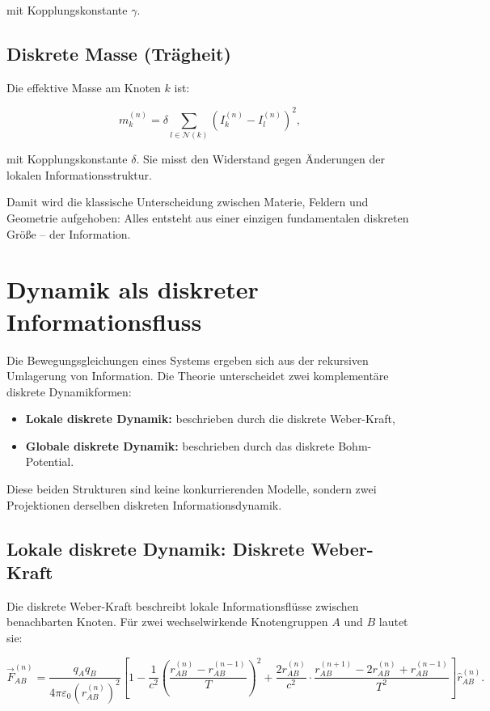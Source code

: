 mit Kopplungskonstante \( \gamma \).

\subsection{Diskrete Masse (Trägheit)}
\label{sub:diskrete_masse}

Die effektive Masse am Knoten \( k \) ist:

\[
m_k^{(n)} = \delta \sum_{l \in \mathcal{N}(k)} \left( I_k^{(n)} - I_l^{(n)} \right)^2,
\]

mit Kopplungskonstante \( \delta \). Sie misst den Widerstand gegen Änderungen der lokalen Informationsstruktur.

Damit wird die klassische Unterscheidung zwischen Materie, Feldern und Geometrie aufgehoben: Alles entsteht aus einer einzigen fundamentalen diskreten Größe – der Information.

\section{Dynamik als diskreter Informationsfluss}
\label{sec:dynamik_als_informationsfluss}

Die Bewegungsgleichungen eines Systems ergeben sich aus der rekursiven Umlagerung von Information. Die Theorie unterscheidet zwei komplementäre diskrete Dynamikformen:

\begin{itemize}
    \item \textbf{Lokale diskrete Dynamik:} beschrieben durch die diskrete Weber-Kraft,
    \item \textbf{Globale diskrete Dynamik:} beschrieben durch das diskrete Bohm-Potential.
\end{itemize}

Diese beiden Strukturen sind keine konkurrierenden Modelle, sondern zwei Projektionen derselben diskreten Informationsdynamik.

\subsection{Lokale diskrete Dynamik: Diskrete Weber-Kraft}
\label{sub:diskrete_weber_kraft}

Die diskrete Weber-Kraft beschreibt lokale Informationsflüsse zwischen benachbarten Knoten. Für zwei wechselwirkende Knotengruppen \( A \) und \( B \) lautet sie:

\[
\vec{F}_{AB}^{(n)} = \frac{q_A q_B}{4\pi\varepsilon_0 (r_{AB}^{(n)})^2} \left[ 1 - \frac{1}{c^2} \left( \frac{r_{AB}^{(n)} - r_{AB}^{(n-1)}}{T} \right)^2 + \frac{2 r_{AB}^{(n)}}{c^2} \cdot \frac{r_{AB}^{(n+1)} - 2r_{AB}^{(n)} + r_{AB}^{(n-1)}}{T^2} \right] \hat{r}_{AB}^{(n)}.
\]

